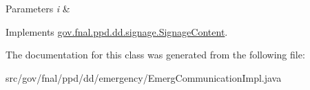 \begin{DoxyParams}{Parameters}
{\em i} & \\
\hline
\end{DoxyParams}


Implements \hyperlink{interfacegov_1_1fnal_1_1ppd_1_1dd_1_1signage_1_1SignageContent_a59c75e24dcec3ea729297104328a7852}{gov.\-fnal.\-ppd.\-dd.\-signage.\-Signage\-Content}.



The documentation for this class was generated from the following file\-:\begin{DoxyCompactItemize}
\item 
src/gov/fnal/ppd/dd/emergency/Emerg\-Communication\-Impl.\-java\end{DoxyCompactItemize}
